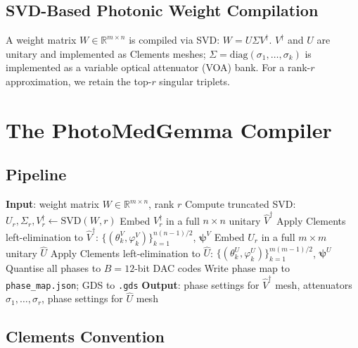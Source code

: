 \documentclass{article}
\begin{document}
\subsection{SVD-Based Photonic Weight Compilation}

A weight matrix $W \in \mathbb{R}^{m\times n}$ is compiled via SVD:
$W = U\Sigma V^\dagger$.
$V^\dagger$ and $U$ are unitary and implemented as Clements meshes;
$\Sigma = \text{diag}(\sigma_1,\ldots,\sigma_k)$ is implemented as a
variable optical attenuator (VOA) bank.
For a rank-$r$ approximation, we retain the top-$r$ singular triplets.

\section{The PhotoMedGemma Compiler}
\label{sec:compiler}

\subsection{Pipeline}

\begin{algorithm}[H]
\caption{PhotoMedGemma Compilation}
\label{alg:compiler}
\begin{algorithmic}[1]
  \STATE \textbf{Input}: weight matrix $W \in \mathbb{R}^{m\times n}$, rank $r$
  \STATE Compute truncated SVD: $U_r, \Sigma_r, V_r^\dagger \leftarrow \text{SVD}(W, r)$
  \STATE Embed $V_r^\dagger$ in a full $n\times n$ unitary $\hat{V}^\dagger$
  \STATE Apply Clements left-elimination to $\hat{V}^\dagger$:
         $\{(\theta_k^V, \varphi_k^V)\}_{k=1}^{n(n-1)/2}$, $\boldsymbol{\psi}^V$
  \STATE Embed $U_r$ in a full $m\times m$ unitary $\hat{U}$
  \STATE Apply Clements left-elimination to $\hat{U}$:
         $\{(\theta_k^U, \varphi_k^U)\}_{k=1}^{m(m-1)/2}$, $\boldsymbol{\psi}^U$
  \STATE Quantise all phases to $B=12$-bit DAC codes
  \STATE Write phase map to \texttt{phase\_map.json}; GDS to \texttt{.gds}
  \STATE \textbf{Output}: phase settings for $\hat{V}^\dagger$ mesh,
         attenuators $\sigma_1,\ldots,\sigma_r$, phase settings for $\hat{U}$ mesh
\end{algorithmic}
\end{algorithm}

\subsection{Clements Convention}
\end{document}
